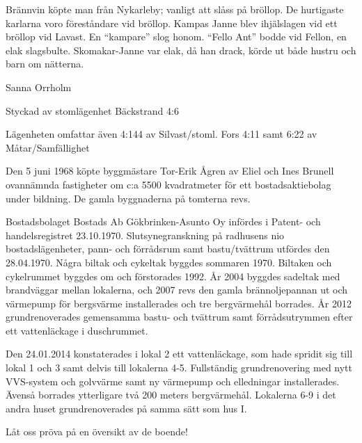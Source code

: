 Brännvin köpte man från Nykarleby; vanligt att slåss på bröllop. De hurtigaste karlarna voro föreståndare vid bröllop. Kampas Janne blev ihjälslagen vid ett bröllop vid Lavast. En ``kampare'' slog honom. ``Fello Ant''  bodde vid Fellon, en elak slagsbulte. Skomakar-Janne var elak, då han drack, körde ut både hustru och barn om nätterna.

Sanna Orrholm




Styckad av stomlägenhet Bäckstrand 4:6


Lägenheten omfattar även  4:144 av Silvast/stoml. Fors 4:11 samt  6:22 av Måtar/Samfällighet


Den 5 juni 1968 köpte byggmästare Tor-Erik Ågren av Eliel och Ines Brunell ovannämnda fastigheter om c:a 5500 kvadratmeter för ett bostadsaktiebolag under bildning. De gamla byggnaderna på tomterna revs.

Bostadsbolaget Bostads Ab Gökbrinken-Asunto Oy infördes i Patent- och handelsregistret 23.10.1970. Slutsynegranskning på radhusens nio bostadslägenheter, pann- och förrådsrum samt bastu/tvättrum utfördes den 28.04.1970. Några biltak och cykeltak byggdes sommaren 1970. Biltaken och cykelrummet byggdes om och förstorades 1992. År 2004 byggdes sadeltak med brandväggar mellan lokalerna, och 2007 revs den gamla brännoljepannan ut och värmepump för bergsvärme installerades och tre bergvärmehål borrades. År 2012 grundrenoverades gemensamma bastu- och tvättrum samt förrådsutrymmen efter ett vattenläckage i duschrummet.


Den 24.01.2014 konstaterades i lokal 2 ett vattenläckage, som hade spridit sig till lokal 1 och 3 samt delvis till lokalerna 4-5. Fullständig grundrenovering med nytt VVS-system och golvvärme samt ny värmepump och elledningar installerades. Ävenså borrades ytterligare två 200 meters bergvärmehål. Lokalerna 6-9 i det andra huset grundrenoverades på samma sätt som hus I.

Låt oss pröva på en översikt av de boende!

